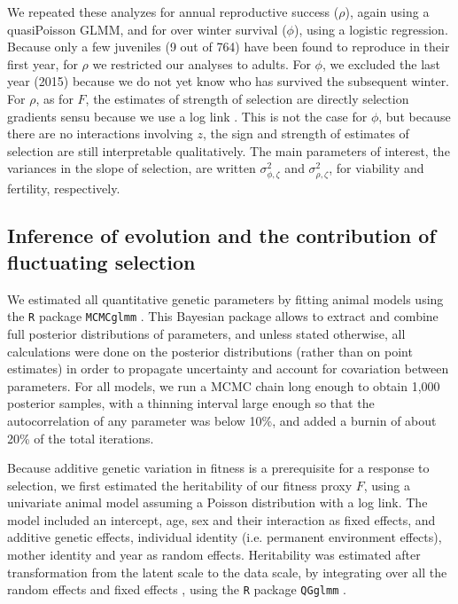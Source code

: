 We repeated these analyzes for annual reproductive success ($\rho$), again using a quasiPoisson GLMM, and for over winter survival ($\phi$), using a logistic regression. Because only a few juveniles (9 out of 764) have been found to reproduce in their first year, for $\rho$ we restricted our analyses to adults.
For $\phi$, we excluded the last year (2015) because we do not yet know who has survived the subsequent winter. For $\rho$, as for $F$, the estimates of strength of selection are directly selection gradients sensu \parencite{Lande1983} because we use a log link \parencite{Smouse1999, Firth2015}. This is not the case for $\phi$, but because there are no interactions involving $z$, the sign and strength of estimates of selection are still interpretable qualitatively. 
The main parameters of interest, the variances in the slope of selection, are written  $\sigma_{\phi,\zeta}^2$ and  $\sigma_{\rho,\zeta}^2$, for viability and fertility, respectively. 

\subsection*{Inference of evolution and the contribution of fluctuating selection}
We estimated all quantitative genetic parameters by fitting animal models \parencite{Henderson1950,Henderson1975,Henderson1976} using the \texttt{R} package \texttt{MCMCglmm} \parencite{Hadfield2010a}. This Bayesian package allows to extract and combine full posterior distributions of parameters, and unless stated otherwise, all calculations were done on the posterior distributions (rather than on point estimates) in order to propagate uncertainty and account for covariation between parameters. For all models, we run a MCMC chain long enough to obtain 1,000 posterior samples, with a thinning interval large enough so that the autocorrelation of any parameter was below 10\%, and added a burnin of about 20\% of the total iterations. 

Because additive genetic variation in fitness is a prerequisite for a response to selection, we first estimated the heritability of our fitness proxy $F$, using a univariate animal model assuming a Poisson distribution with a log link. The model included an intercept, age, sex and their interaction as fixed effects, and additive genetic effects, individual identity (i.e. permanent environment effects), mother identity and year as random effects. Heritability was estimated after transformation from the latent scale to the data scale, by integrating over all the random effects and fixed effects \parencite{Morrissey2015,DeVillemereuil2016}, using the \texttt{R} package \texttt{QGglmm} \parencite{DeVillemereuil2016}.


